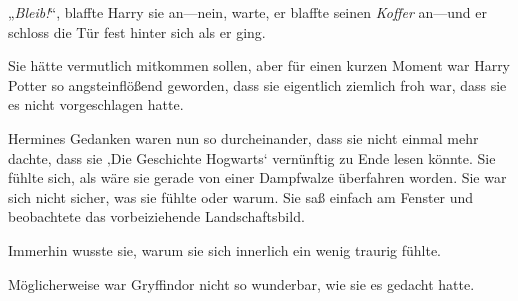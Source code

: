 „\emph{Bleib!}“, blaffte Harry sie an—nein, warte, er blaffte seinen \emph{Koffer} an—und er schloss die Tür fest hinter sich als er ging.

Sie hätte vermutlich mitkommen sollen, aber für einen kurzen Moment war Harry Potter so angsteinflößend geworden, dass sie eigentlich ziemlich froh war, dass sie es nicht vorgeschlagen hatte.

Hermines Gedanken waren nun so durcheinander, dass sie nicht einmal mehr dachte, dass sie ‚Die Geschichte Hogwarts‘ vernünftig zu Ende lesen könnte. Sie fühlte sich, als wäre sie gerade von einer Dampfwalze überfahren worden. Sie war sich nicht sicher, was sie fühlte oder warum. Sie saß einfach am Fenster und beobachtete das vorbeiziehende Landschaftsbild.

Immerhin wusste sie, warum sie sich innerlich ein wenig traurig fühlte.

Möglicherweise war Gryffindor nicht so wunderbar, wie sie es gedacht hatte.


